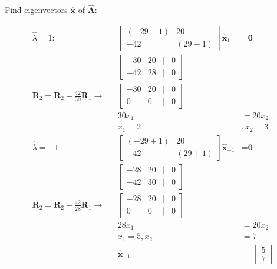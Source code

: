 \documentclass{article}
\begin{document}
Find eigenvectors $\hat{\textbf{x}}$ of $\hat{\textbf{A}}$:

\begin{align}
    \label{eq:24}
    \hat\lambda = 1: &&
    \begin{bmatrix}
    (-29-1) & 20\\
    -42 & (29-1)
    \end{bmatrix} \hat{\textbf{x}}_1 &= \textbf{0}
    \\
    \label{eq:25}
    && \begin{bmatrix}
    -30 & 20 &|& 0\\
    -42 & 28 &|& 0
    \end{bmatrix}
    \\
    \label{eq:26}
    \textbf{R}_2 = \textbf{R}_2 - \frac{42}{30}\textbf{R}_1 \rightarrow && \begin{bmatrix}
    -30 & 20 &|& 0\\
    0 & 0 &|& 0
    \end{bmatrix}
    \\
    \label{eq:27}
    && 30x_1 &= 20 x_2
    \\
    \label{eq:28}
    && x_1 = 2 &, x_2 = 3
    \\
    \label{eq:29}
    \hat\lambda = -1: && \begin{bmatrix}
    (-29 + 1) & 20 \\
    -42 & (29+1) 
    \end{bmatrix} \hat{\textbf{x}}_{-1} &= \textbf{0}
    \\
    \label{eq:30}
    && \begin{bmatrix}
    -28 & 20 &|& 0\\
    -42 & 30 &|& 0
    \end{bmatrix}
    \\
    \label{eq:31}
    \textbf{R}_2 = \textbf{R}_2 - \frac{42}{28}\textbf{R}_1 \rightarrow && \begin{bmatrix}
    -28 & 20 &|& 0\\
    0 & 0 &|& 0
    \end{bmatrix}
    \\
    \label{eq:32}
    && 28x_1 &= 20 x_2
    \\
    \label{eq:33}
    && x_1 = 5, x_2 &= 7
    \\
    \label{eq:34}
    && \hat{\textbf{x}}_{-1} &= \begin{bmatrix}
    5\\7
    \end{bmatrix}
\end{align}
\end{document}
